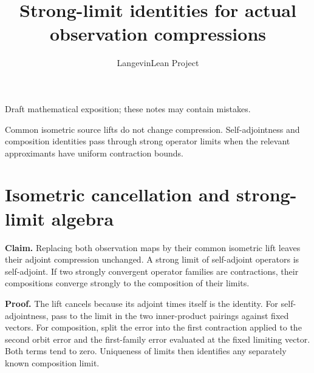 \documentclass[11pt,a4paper]{article}
\title{\texorpdfstring{Strong-limit identities for actual observation compressions}{Strong-limit identities for actual observation compressions}}
\author{LangevinLean Project}
\date{}
\begin{document}
\maketitle
Draft mathematical exposition; these notes may contain mistakes.


Common isometric source lifts do not change compression. Self-adjointness and composition identities pass through strong operator limits when the relevant approximants have uniform contraction bounds.


\section{\texorpdfstring{Isometric cancellation and strong-limit algebra}{Isometric cancellation and strong-limit algebra}}


\textbf{Claim.} Replacing both observation maps by their common isometric lift leaves their adjoint compression unchanged. A strong limit of self-adjoint operators is self-adjoint. If two strongly convergent operator families are contractions, their compositions converge strongly to the composition of their limits.



\textbf{Proof.} The lift cancels because its adjoint times itself is the identity. For self-adjointness, pass to the limit in the two inner-product pairings against fixed vectors. For composition, split the error into the first contraction applied to the second orbit error and the first-family error evaluated at the fixed limiting vector. Both terms tend to zero. Uniqueness of limits then identifies any separately known composition limit.
\end{document}
